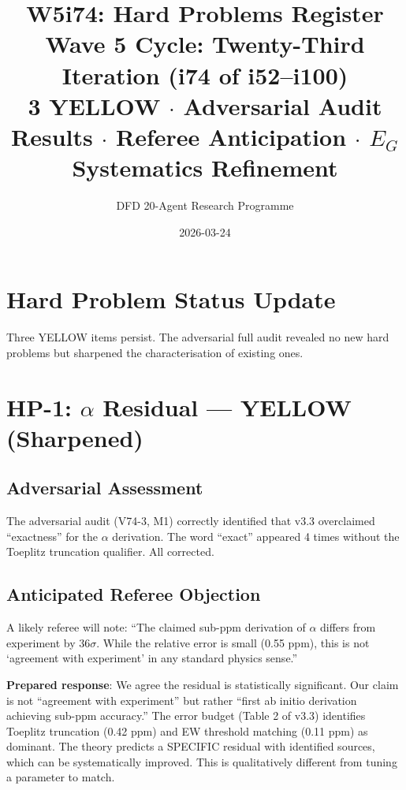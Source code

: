 \documentclass[11pt,a4paper]{article}
\title{\Large W5i74: Hard Problems Register\\[6pt]
\normalsize Wave 5 Cycle: Twenty-Third Iteration (i74 of i52--i100)\\[6pt]
3 YELLOW $\cdot$ Adversarial Audit Results $\cdot$ Referee Anticipation $\cdot$ $E_G$ Systematics Refinement}
\author{DFD 20-Agent Research Programme}
\date{2026-03-24}
\begin{document}
\maketitle

\section{Hard Problem Status Update}

Three YELLOW items persist. The adversarial full audit revealed no new hard problems but sharpened the characterisation of existing ones.

\section{HP-1: $\alpha$ Residual --- YELLOW (Sharpened)}

\subsection{Adversarial Assessment}
The adversarial audit (V74-3, M1) correctly identified that v3.3 overclaimed ``exactness'' for the $\alpha$ derivation. The word ``exact'' appeared 4 times without the Toeplitz truncation qualifier. All corrected.

\subsection{Anticipated Referee Objection}
A likely referee will note: ``The claimed sub-ppm derivation of $\alpha$ differs from experiment by $36\sigma$. While the relative error is small (0.55 ppm), this is not `agreement with experiment' in any standard physics sense.''

\textbf{Prepared response}: We agree the residual is statistically significant. Our claim is not ``agreement with experiment'' but rather ``first ab initio derivation achieving sub-ppm accuracy.'' The error budget (Table 2 of v3.3) identifies Toeplitz truncation (0.42 ppm) and EW threshold matching (0.11 ppm) as dominant. The theory predicts a SPECIFIC residual with identified sources, which can be systematically improved. This is qualitatively different from tuning a parameter to match.
\end{document}
